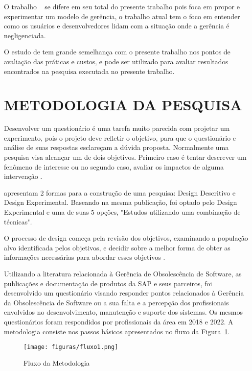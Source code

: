 O trabalho ~ se difere em seu total do presente trabalho pois foca em propor e experimentar um modelo de gerência, o trabalho atual tem o foco em entender como os usuários e desenvolvedores lidam com a situação onde a gerência é negligenciada.

O estudo de  tem grande semelhança com o presente trabalho nos pontos de avaliação das práticas e custos, e pode ser utilizado para avaliar resultados encontrados na pesquisa executada no presente trabalho.

\section{\esp METODOLOGIA DA PESQUISA}

Desenvolver um questionário é uma tarefa muito parecida com projetar um experimento, pois o projeto deve refletir o objetivo, para que o questionário e análise de suas respostas esclareçam a dúvida proposta. Normalmente uma pesquisa visa alcançar um de dois objetivos. Primeiro caso é tentar descrever um fenômeno de interesse ou no segundo caso, avaliar os impactos de alguma intervenção \cite{Kitchenham}.

 apresentam 2 formas para a construção de uma pesquisa: Design Descritivo e Design Experimental. Baseando na mesma publicação, foi optado pelo Design Experimental e uma de suas 5 opções, "Estudos utilizando uma combinação de técnicas".

O processo de design começa pela revisão dos objetivos, examinando a população alvo identificada pelos objetivos, e decidir sobre a melhor forma de obter as informações necessárias para abordar esses objetivos \cite{Kitchenham}.

Utilizando a literatura relacionada à Gerência de Obsolescência de Software, as publicações e documentação de produtos da SAP e seus parceiros, foi desenvolvido um questionário visando responder pontos relacionados à Gerência da Obsolescência de Software ou a sua falta e a percepção dos profissionais envolvidos no desenvolvimento, manutenção e suporte dos sistemas. Os mesmos questionários foram respondidos por profissionais da área em 2018 e 2022.
\newpage
A metodologia consiste nos passos básicos apresentados no fluxo da Figura~\ref{fig:figurametod}.

\begin{figure}[ht]
	\centering	
	\caption[\hspace{0.1cm}PGO.]{Fluxo da Metodologia}
	\vspace{0.2cm}
	\texttt{[image: figuras/fluxo1.png]}
	\vspace{-0.2cm}
	\\\textbf{}	
	\label{fig:figurametod}
\end{figure}
\vspace{-0.5cm}

